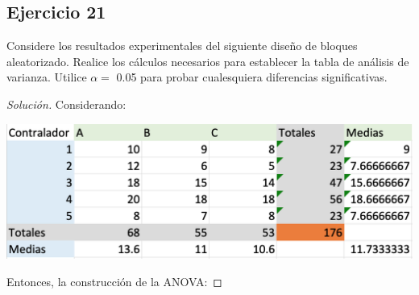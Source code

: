 \documentclass[a4paper,12pt]{article}
\newenvironment{solution}
  {\renewcommand\qedsymbol{$\blacksquare$}\begin{proof}[Solución]}
  {\end{proof}}
\begin{document}
\subsection{Ejercicio 21}
Considere los resultados experimentales del siguiente diseño de bloques aleatorizado. Realice los cálculos necesarios para establecer la tabla de análisis de varianza. Utilice $\alpha=$ 0.05 para probar cualesquiera diferencias significativas.
\begin{solution}
Considerando: 
\begin{center}
    \includegraphics[scale=0.3]{Imagenes/13.png}
\end{center}
Entonces, la construcción de la ANOVA: 


\end{solution}
\end{document}
